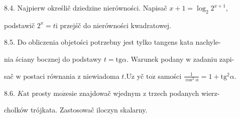 \documentclass[a4paper,12pt]{article}
\begin{document}
8.4. Najpierw określič dziedzine nierówności. Napisač $x+1=\log_{2}2^{x+1}$,

podstawič $2^{x}=t\mathrm{i}$ przejśč do nierówności kwadratowej.

8.5. Do obliczenia objetości potrzebny jest tylko tangens kata nachyle-

nia ściany bocznej do podstawy $ t=\mathrm{t}\mathrm{g}\alpha$. Warunek podany $\mathrm{w}$ zadaniu zapi-

sač $\mathrm{w}$ postaci równania $\mathrm{z}$ niewiadoma $t. \mathrm{U}\dot{\mathrm{z}}$ yč $\mathrm{t}\mathrm{o}\dot{\mathrm{z}}$ samości $\displaystyle \frac{1}{\cos^{2}\alpha}=1+\mathrm{t}\mathrm{g}^{2}\alpha.$

8.6. $K\mathrm{a}\mathrm{t}$ prosty $\mathrm{m}\mathrm{o}\dot{\mathrm{z}}\mathrm{e}\mathrm{s}\mathrm{i}\mathrm{e}$ znajdowač wjednym $\mathrm{z}$ trzech podanych wierz-

cholków trójkata. Zastosowač iloczyn skalarny.
\end{document}
